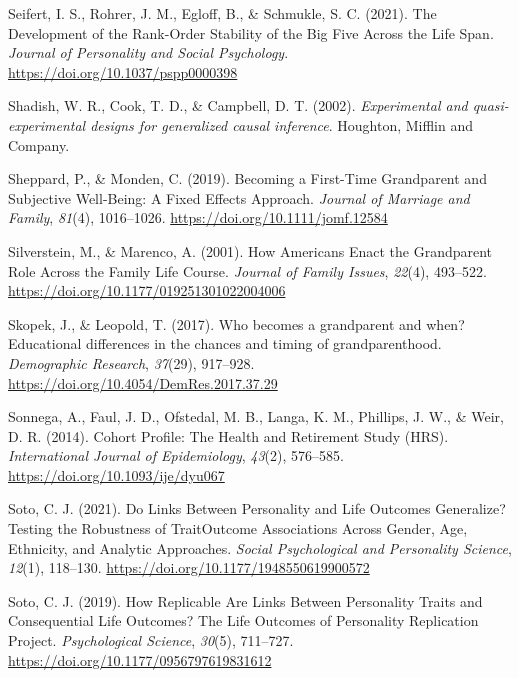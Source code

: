 \documentclass[
  english,
  man, noextraspace]{apa7}
\begin{document}
\leavevmode\hypertarget{ref-seifertDevelopmentRankOrderStability2021}{}%
Seifert, I. S., Rohrer, J. M., Egloff, B., \& Schmukle, S. C. (2021). The Development of the Rank-Order Stability of the Big Five Across the Life Span. \emph{Journal of Personality and Social Psychology}. \url{https://doi.org/10.1037/pspp0000398}

\leavevmode\hypertarget{ref-shadishExperimentalQuasiexperimentalDesigns2002}{}%
Shadish, W. R., Cook, T. D., \& Campbell, D. T. (2002). \emph{Experimental and quasi-experimental designs for generalized causal inference}. Houghton, Mifflin and Company.

\leavevmode\hypertarget{ref-sheppardBecomingFirstTimeGrandparent2019}{}%
Sheppard, P., \& Monden, C. (2019). Becoming a First-Time Grandparent and Subjective Well-Being: A Fixed Effects Approach. \emph{Journal of Marriage and Family}, \emph{81}(4), 1016--1026. \url{https://doi.org/10.1111/jomf.12584}

\leavevmode\hypertarget{ref-silversteinHowAmericansEnact2001}{}%
Silverstein, M., \& Marenco, A. (2001). How Americans Enact the Grandparent Role Across the Family Life Course. \emph{Journal of Family Issues}, \emph{22}(4), 493--522. \url{https://doi.org/10.1177/019251301022004006}

\leavevmode\hypertarget{ref-skopekWhoBecomesGrandparent2017}{}%
Skopek, J., \& Leopold, T. (2017). Who becomes a grandparent and when? Educational differences in the chances and timing of grandparenthood. \emph{Demographic Research}, \emph{37}(29), 917--928. \url{https://doi.org/10.4054/DemRes.2017.37.29}

\leavevmode\hypertarget{ref-sonnegaCohortProfileHealth2014}{}%
Sonnega, A., Faul, J. D., Ofstedal, M. B., Langa, K. M., Phillips, J. W., \& Weir, D. R. (2014). Cohort Profile: The Health and Retirement Study (HRS). \emph{International Journal of Epidemiology}, \emph{43}(2), 576--585. \url{https://doi.org/10.1093/ije/dyu067}

\leavevmode\hypertarget{ref-sotoLinksPersonalityLife2021}{}%
Soto, C. J. (2021). Do Links Between Personality and Life Outcomes Generalize? Testing the Robustness of TraitOutcome Associations Across Gender, Age, Ethnicity, and Analytic Approaches. \emph{Social Psychological and Personality Science}, \emph{12}(1), 118--130. \url{https://doi.org/10.1177/1948550619900572}

\leavevmode\hypertarget{ref-sotoHowReplicableAre2019}{}%
Soto, C. J. (2019). How Replicable Are Links Between Personality Traits and Consequential Life Outcomes? The Life Outcomes of Personality Replication Project. \emph{Psychological Science}, \emph{30}(5), 711--727. \url{https://doi.org/10.1177/0956797619831612}
\end{document}
